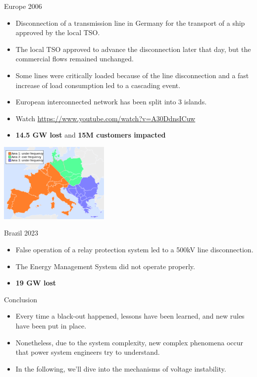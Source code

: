 \begin{frame}[allowframebreaks]{Europe 2006}
\begin{itemize}
    \item Disconnection of a transmission line in Germany for the transport of a ship approved by the local TSO.
    \item The local TSO approved to advance the disconnection later that day, but the commercial flows remained unchanged.
    \item Some lines were critically loaded because of the line disconnection and a fast increase of load consumption led to a cascading event.
    \item European interconnected network has been split into 3 islands.
    \item Watch \url{https://www.youtube.com/watch?v=A30DdnsICuw}
    \item \textbf{14.5 GW lost} and \textbf{15M customers impacted} \cite{li2007analysis}
\end{itemize}

\begin{center}
\includegraphics[width=0.4\textwidth]{images/EuropeBlackOut.png}
\end{center}
\end{frame}

\begin{frame}{Brazil 2023}
\begin{itemize}
    \item False operation of a relay protection system led to a 500kV line disconnection.
    \item The Energy Management System did not operate properly.
    \item \textbf{19 GW lost}
\end{itemize}
\end{frame}
\begin{frame}{Conclusion}
\begin{itemize}
    \item Every time a black-out happened, lessons have been learned, and new rules have been put in place.
    \item Nonetheless, due to the system complexity, new complex phenomena occur that power system engineers try to understand.
    \item In the following, we'll dive into the mechanisms of voltage instability.
\end{itemize}
\end{frame}


